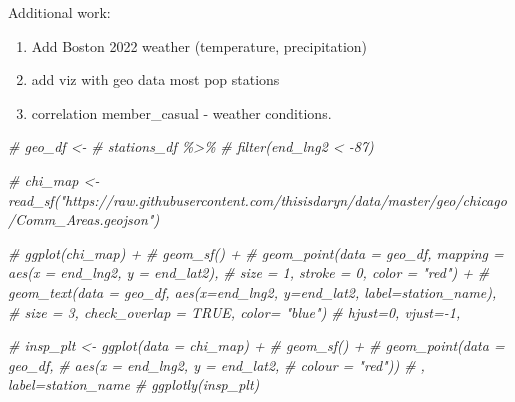 \documentclass[
]{article}
\newenvironment{Shaded}{\begin{snugshade}}{\end{snugshade}}
\newcommand{\CommentTok}[1]{\textcolor[rgb]{0.56,0.35,0.01}{\textit{#1}}}
\begin{document}
Additional work:

\begin{enumerate}
\def\labelenumi{\arabic{enumi}.}
\item
  Add Boston 2022 weather (temperature, precipitation)
\item
  add viz with geo data most pop stations
\item
  correlation member\_casual - weather conditions.
\end{enumerate}

\begin{Shaded}
\begin{Highlighting}[]
\CommentTok{\# geo\_df \textless{}{-}}
\CommentTok{\# stations\_df \%\textgreater{}\% }
  \CommentTok{\# filter(end\_lng2 \textless{} {-}87)}
\end{Highlighting}
\end{Shaded}

\begin{Shaded}
\begin{Highlighting}[]
\CommentTok{\# chi\_map \textless{}{-} read\_sf("https://raw.githubusercontent.com/thisisdaryn/data/master/geo/chicago/Comm\_Areas.geojson")}

  \CommentTok{\# ggplot(chi\_map) +}
  \CommentTok{\# geom\_sf() + }
  \CommentTok{\# geom\_point(data = geo\_df, mapping = aes(x = end\_lng2, y = end\_lat2),}
  \CommentTok{\#            size = 1, stroke = 0, color = "red") +}
  \CommentTok{\# geom\_text(data = geo\_df, aes(x=end\_lng2, y=end\_lat2, label=station\_name),}
  \CommentTok{\#           size = 3,  check\_overlap = TRUE, color= "blue") \# hjust=0, vjust={-}1,}
\end{Highlighting}
\end{Shaded}

\begin{Shaded}
\begin{Highlighting}[]
\CommentTok{\# insp\_plt \textless{}{-} ggplot(data = chi\_map) + }
\CommentTok{\#   geom\_sf() +}
\CommentTok{\#   geom\_point(data = geo\_df, }
\CommentTok{\#              aes(x = end\_lng2, y = end\_lat2, }
\CommentTok{\#                  colour = "red"))  \# , label=station\_name}
\CommentTok{\# ggplotly(insp\_plt)}
\end{Highlighting}
\end{Shaded}
\end{document}
